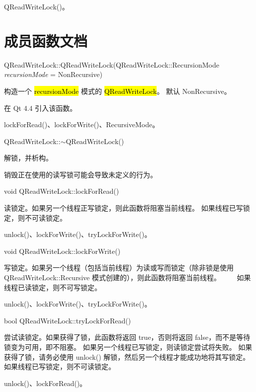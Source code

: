 \begin{seeAlso}
QReadWriteLock()。
\end{seeAlso}

\section{成员函数文档}

QReadWriteLock::QReadWriteLock(QReadWriteLock::RecursionMode \emph{recursionMode} = NonRecursive)

构造一个 \hl{recursionMode} 模式的 \hl{QReadWriteLock}。
默认 NonRecursive。

在 Qt 4.4 引入该函数。


\begin{seeAlso}
lockForRead()、lockForWrite()、RecursiveMode。
\end{seeAlso} 

QReadWriteLock::$\sim$QReadWriteLock()

解锁，并析构。

\begin{warning}
销毁正在使用的读写锁可能会导致未定义的行为。
\end{warning} 

void QReadWriteLock::lockForRead()

读锁定。如果另一个线程正写锁定，则此函数将阻塞当前线程。
如果线程已写锁定，则不可读锁定。

\begin{seeAlso}
unlock()、lockForWrite()、tryLockForWrite()。
\end{seeAlso} 

void QReadWriteLock::lockForWrite()

写锁定。如果另一个线程（包括当前线程）为读或写而锁定（除非锁是使用 QReadWriteLock::Recursive 模式创建的），则此函数将阻塞当前线程。   如果线程已读锁定，则不可写锁定。

\begin{seeAlso}
unlock()、lockForWrite()、tryLockForWrite()。
\end{seeAlso} 

bool QReadWriteLock::tryLockForRead()

尝试读锁定。如果获得了锁，此函数将返回 true，否则将返回 false，而不是等待锁变为可用，即不阻塞。
如果另一个线程已写锁定，则读锁定尝试将失败。
如果获得了锁，请务必使用 unlock() 解锁，然后另一个线程才能成功地将其写锁定。
如果线程已写锁定，则不可读锁定。

\begin{seeAlso}
unlock()、lockForRead()。
\end{seeAlso} 

